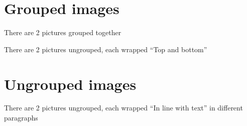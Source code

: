 \documentclass[11pt,a4paper]{article}
\begin{document}
\section{Grouped images}

\begin{figure}[h]
\end{figure}

\begin{figure}[h]
\end{figure}

There are 2 pictures grouped together

\begin{figure}[h]
\end{figure}

\begin{figure}[h]
\end{figure}

There are 2 pictures ungrouped, each wrapped “Top and bottom”

\section{Ungrouped images}

There are 2 pictures ungrouped, each wrapped “In line with text” in different paragraphs

\begin{figure}[h]
\end{figure}

\begin{figure}[h]
\end{figure}
\end{document}
